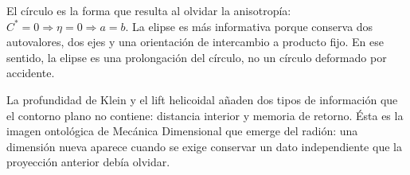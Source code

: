 El círculo es la forma que resulta al olvidar la anisotropía:
\(C^*=0\Rightarrow\eta=0\Rightarrow a=b\). La elipse es más informativa porque
conserva dos autovalores, dos ejes y una orientación de intercambio a producto
fijo. En ese sentido, la elipse es una prolongación del círculo, no un círculo
deformado por accidente.

La profundidad de Klein y el lift helicoidal añaden dos tipos de información
que el contorno plano no contiene: distancia interior y memoria de retorno.
Ésta es la imagen ontológica de Mecánica Dimensional que emerge del radión:
una dimensión nueva aparece cuando se exige conservar un dato independiente
que la proyección anterior debía olvidar.

